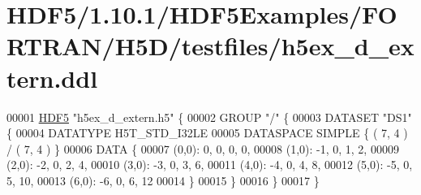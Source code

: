 \hypertarget{_h_d_f5_21_810_81_2_h_d_f5_examples_2_f_o_r_t_r_a_n_2_h5_d_2testfiles_2h5ex__d__extern_8ddl_source}{}\section{H\+D\+F5/1.10.1/\+H\+D\+F5\+Examples/\+F\+O\+R\+T\+R\+A\+N/\+H5\+D/testfiles/h5ex\+\_\+d\+\_\+extern.ddl}
\label{_h_d_f5_21_810_81_2_h_d_f5_examples_2_f_o_r_t_r_a_n_2_h5_d_2testfiles_2h5ex__d__extern_8ddl_source}

\begin{DoxyCode}
00001 \hyperlink{namespace_h_d_f5}{HDF5} \textcolor{stringliteral}{"h5ex\_d\_extern.h5"} \{
00002 GROUP \textcolor{stringliteral}{"/"} \{
00003    DATASET \textcolor{stringliteral}{"DS1"} \{
00004       DATATYPE  H5T\_STD\_I32LE
00005       DATASPACE  SIMPLE \{ ( 7, 4 ) / ( 7, 4 ) \}
00006       DATA \{
00007       (0,0): 0, 0, 0, 0,
00008       (1,0): -1, 0, 1, 2,
00009       (2,0): -2, 0, 2, 4,
00010       (3,0): -3, 0, 3, 6,
00011       (4,0): -4, 0, 4, 8,
00012       (5,0): -5, 0, 5, 10,
00013       (6,0): -6, 0, 6, 12
00014       \}
00015    \}
00016 \}
00017 \}
\end{DoxyCode}
